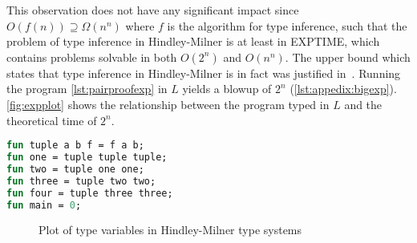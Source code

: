 \documentclass[11pt,oneside,a4paper]{report}
\begin{document}
This observation does not have any significant impact since $O(f(n)) \supseteq \Omega(n^n)$ where $f$ is the algorithm for type inference, such that the problem of type inference in Hindley-Milner is at least in EXPTIME, which contains problems solvable in both $O(2^n)$ and $O(n^n)$.
The upper bound which states that type inference in Hindley-Milner is in fact  was justified in~\cite{kfoury1990ml,mairson1989deciding}.
Running the program \autoref{lst:pairproofexp} in $L$ yields a blowup of $2^n$ (\autoref{lst:appedix:bigexp}).
\autoref{fig:expplot} shows the relationship between the program typed in $L$ and the theoretical time of $2^n$.
\begin{lstlisting}[language=ML,caption={Nested tuples with different type variables},label={lst:pairproofexp},mathescape=true]
fun tuple a b f = f a b;
fun one = tuple tuple tuple;
fun two = tuple one one;
fun three = tuple two two;
fun four = tuple three three;
fun main = 0;
\end{lstlisting}
\begin{figure}[ht]
    \centering
{}
    \caption{Plot of type variables in Hindley-Milner type systems}
    \label{fig:expplot}
\end{figure}
\end{document}
